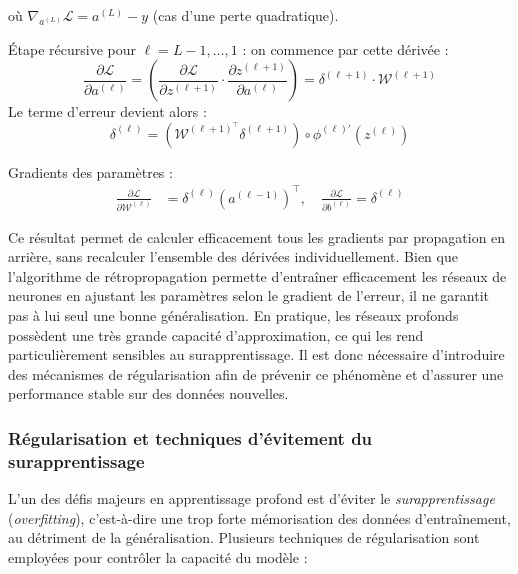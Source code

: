 \begin{demonstration}
où $\nabla_{a^{(L)}} \mathcal{L} = a^{(L)} - y$ (cas d'une perte quadratique).

\medskip

Étape récursive pour $\ell = L-1, \dots, 1$ : on commence par cette dérivée :
\[
\frac{\partial \mathcal{L}}{\partial a^{(\ell)}} 
= \left( \frac{\partial \mathcal{L}}{\partial z^{(\ell+1)}} \cdot \frac{\partial z^{(\ell+1)}}{\partial a^{(\ell)}} \right) 
= \delta^{(\ell+1)} \cdot \mathcal{W}^{(\ell+1)}
\]
Le terme d’erreur devient alors :
\[
\delta^{(\ell)} = \left( \mathcal{W}^{(\ell+1)^\top} \delta^{(\ell+1)} \right) \circ \phi^{(\ell)'}(z^{(\ell)})
\]

\medskip

Gradients des paramètres :
\[
\begin{aligned}
\frac{\partial \mathcal{L}}{\partial \mathcal{W}^{(\ell)}} &= \delta^{(\ell)} (a^{(\ell-1)})^\top, \quad \frac{\partial \mathcal{L}}{\partial b^{(\ell)}} = \delta^{(\ell)}
\end{aligned}
\]
\end{demonstration}

Ce résultat permet de calculer efficacement tous les gradients par propagation en arrière, sans recalculer l’ensemble des dérivées individuellement. Bien que l’algorithme de rétropropagation permette d’entraîner efficacement les réseaux de neurones en ajustant les paramètres selon le gradient de l’erreur, il ne garantit pas à lui seul une bonne généralisation. En pratique, les réseaux profonds possèdent une très grande capacité d’approximation, ce qui les rend particulièrement sensibles au surapprentissage. Il est donc nécessaire d’introduire des mécanismes de régularisation afin de prévenir ce phénomène et d’assurer une performance stable sur des données nouvelles.

\subsubsection{Régularisation et techniques d'évitement du surapprentissage}

L’un des défis majeurs en apprentissage profond est d’éviter le \textit{surapprentissage} (\textit{overfitting}), c’est-à-dire une trop forte mémorisation des données d’entraînement, au détriment de la généralisation. Plusieurs techniques de régularisation sont employées pour contrôler la capacité du modèle :


